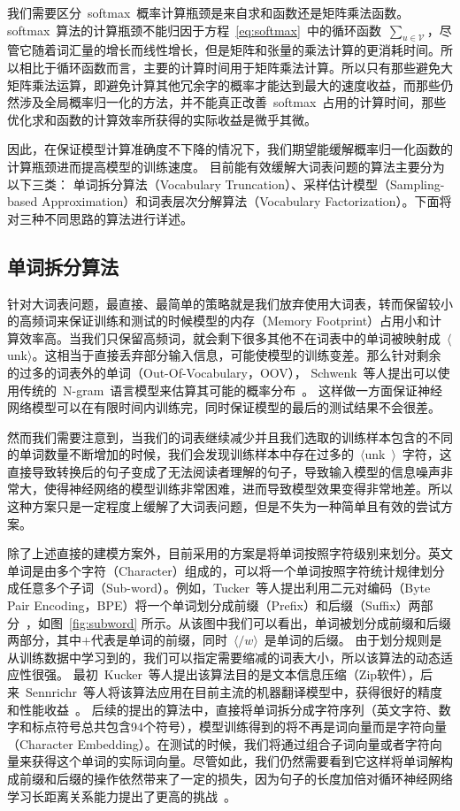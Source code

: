 我们需要区分~softmax~概率计算瓶颈是来自求和函数还是矩阵乘法函数。
softmax~算法的计算瓶颈不能归因于方程~\ref{eq:softmax}~中的循环函数~$\sum_ {u \in \mathcal {V}}$，尽管它随着词汇量的增长而线性增长，但是矩阵和张量的乘法计算的更消耗时间。所以相比于循环函数而言，主要的计算时间用于矩阵乘法计算。所以只有那些避免大矩阵乘法运算，即避免计算其他冗余字的概率才能达到最大的速度收益，而那些仍然涉及全局概率归一化的方法，并不能真正改善~softmax~占用的计算时间，那些优化求和函数的计算效率所获得的实际收益是微乎其微。


因此，在保证模型计算准确度不下降的情况下，我们期望能缓解概率归一化函数的计算瓶颈进而提高模型的训练速度。 目前能有效缓解大词表问题的算法主要分为以下三类： 单词拆分算法（Vocabulary Truncation）、采样估计模型（Sampling-based Approximation）和词表层次分解算法（Vocabulary Factorization）。下面将对三种不同思路的算法进行详述。


\subsection{单词拆分算法}
针对大词表问题，最直接、最简单的策略就是我们放弃使用大词表，转而保留较小的高频词来保证训练和测试的时候模型的内存（Memory Footprint）占用小和计算效率高。当我们只保留高频词，就会剩下很多其他不在词表中的单词被映射成~$\langle$unk$\rangle$。这相当于直接丢弃部分输入信息，可能使模型的训练变差。那么针对剩余的过多的词表外的单词（Out-Of-Vocabulary，OOV）， Schwenk~等人提出可以使用传统的~N-gram~语言模型来估算其可能的概率分布~。
这样做一方面保证神经网络模型可以在有限时间内训练完，同时保证模型的最后的测试结果不会很差。

然而我们需要注意到，当我们的词表继续减少并且我们选取的训练样本包含的不同的单词数量不断增加的时候，我们会发现训练样本中存在过多的~$\langle$unk~$\rangle$~字符，这直接导致转换后的句子变成了无法阅读者理解的句子，导致输入模型的信息噪声非常大，使得神经网络的模型训练非常困难，进而导致模型效果变得非常地差。所以这种方案只是一定程度上缓解了大词表问题，但是不失为一种简单且有效的尝试方案。

除了上述直接的建模方案外，目前采用的方案是将单词按照字符级别来划分。英文单词是由多个字符（Character）组成的，可以将一个单词按照字符统计规律划分成任意多个子词（Sub-word）。例如，Tucker~等人提出利用二元对编码（Byte Pair Encoding，BPE）将一个单词划分成前缀（Prefix）和后缀（Suffix）两部分~，如图~\ref{fig:subword} 所示。从该图中我们可以看出，单词被划分成前缀和后缀两部分，其中$+$代表是单词的前缀，同时~$\langle /w \rangle$~是单词的后缀。
由于划分规则是从训练数据中学习到的，我们可以指定需要缩减的词表大小，所以该算法的动态适应性很强。
最初~Kucker~等人提出该算法目的是文本信息压缩（Zip软件），后来~Sennrichr~等人将该算法应用在目前主流的机器翻译模型中，获得很好的精度和性能收益~。
后续的提出的算法中，直接将单词拆分成字符序列（英文字符、数字和标点符号总共包含94个符号），模型训练得到的将不再是词向量而是字符向量（Character Embedding）。在测试的时候，我们将通过组合子词向量或者字符向量来获得这个单词的实际词向量。尽管如此，我们仍然需要看到它这样将单词解构成前缀和后缀的操作依然带来了一定的损失，因为句子的长度加倍对循环神经网络学习长距离关系能力提出了更高的挑战~。

